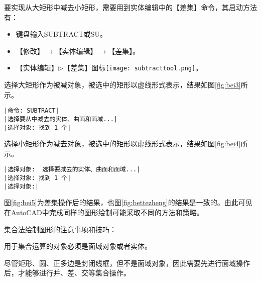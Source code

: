 \begin{procedure}
要实现从大矩形中减去小矩形，需要用到实体编辑中的【差集】命令，其启动方法有：
\begin{itemize}
\item 键盘输入SUBTRACT或SU。
\item 【修改】$\rightarrow$【实体编辑】$\rightarrow$【差集】。
\item 【实体编辑】$\triangleright$【差集】图标\texttt{[image: subtracttool.png]}。
\end{itemize}
选择大矩形作为被减对象，被选中的矩形以虚线形式表示，结果如图\ref{fig:bei3}所示。
\begin{lstlisting}
|命令: SUBTRACT|
|选择要从中减去的实体、曲面和面域...|
|选择对象: 找到 1 个|
\end{lstlisting}
选择小矩形作为减去对象，被选中的矩形以虚线形式表示，结果如图\ref{fig:bei4}所示。
\begin{lstlisting}
|选择对象:  选择要减去的实体、曲面和面域...|
|选择对象: 找到 1 个|
|选择对象:|
\end{lstlisting}
图\ref{fig:bei5}为差集操作后的结果，也图\ref{fig:bettezheng}的结果是一致的。由此可见在AutoCAD中完成同样的图形绘制可能采取不同的方法和策略。

\end{procedure}

集合法绘制图形的注意事项和技巧：
\begin{tips}
\item 用于集合运算的对象必须是面域对象或者实体。
\item 尽管矩形、圆、正多边是封闭线框，但不是面域对象，因此需要先进行面域操作后，才能够进行并、差、交等集合操作。
\end{tips}
\endinput